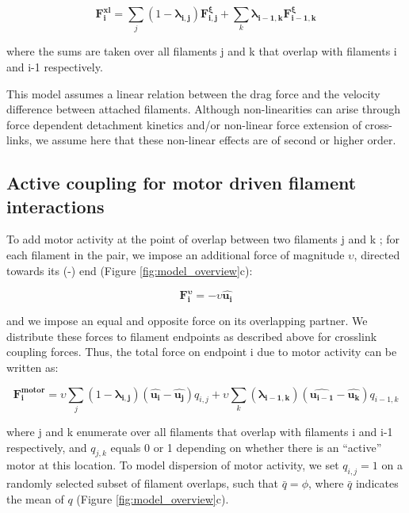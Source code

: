 \documentclass[10pt,letterpaper]{article}
\begin{document}
\begin{equation}
\label{eqn: total drag couple}
\mathbf{F^{xl}_{i}} = \sum_j (1 - \mathbf{\lambda_{i,j}}) \mathbf{F^{\xi}_{i,j}} + \sum_k \mathbf{\lambda_{i-1,k}} \mathbf{F^{\xi}_{i-1,k}}
\end{equation}

where the sums are taken over all filaments j and k that overlap with filaments i and i-1 respectively.  

This model assumes a linear relation between the drag force and the velocity difference between attached filaments.   Although non-linearities can arise through force dependent detachment kinetics and/or non-linear force extension of cross-links, we assume here that these non-linear effects are of second or higher order. 

\subsection*{Active coupling for motor driven filament interactions}

To add motor activity at the point of overlap between two filaments j and k ; for each filament in the pair, we impose an additional force of magnitude $\upsilon$, directed towards its (-) end (Figure \ref{fig:model_overview}c):

\begin{equation}
\label{eqn:directedmotorforce}
\mathbf{F^{\upsilon}_{i}}=-\upsilon \mathbf{\hat{u_i}}
\end{equation}

and we impose an equal and opposite force on its overlapping partner.  We distribute these forces to filament endpoints as described above for crosslink coupling forces.  Thus, the total force on endpoint i due to motor activity can be written as:

\begin{equation}
\label{eqn:active}
\mathbf{F^{motor}_{i}} = \upsilon \sum_j (1 - \mathbf{\lambda_{i,j}}) \left (\mathbf{\hat{u_{i}}} - \mathbf{\hat{u_j}} \right ) q_{i,j}
                        +  \upsilon \sum_k (\mathbf{\lambda_{i-1,k}}) \left (\mathbf{\hat{u_{i-1}}} - \mathbf{\hat{u_k}} \right ) q_{i-1,k} 
\end{equation}


where j and k enumerate over all filaments that overlap with filaments i and i-1 respectively, and $q_{j,k}$ equals 0 or 1 depending on whether there is an ``active'' motor at this location. To model dispersion of motor activity, we set $q_{i,j}=1$  on a randomly selected subset of filament overlaps, such that $\bar{q}=\phi$, where $\bar{q}$ indicates the mean of $q$ (Figure \ref{fig:model_overview}c).
\end{document}
